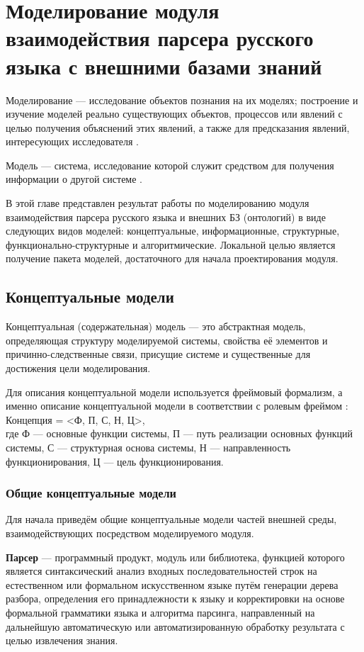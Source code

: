 \indent \section{Моделирование модуля взаимодействия парсера русского языка с внешними базами знаний}

Моделирование --- исследование объектов познания на их моделях; построение и изучение моделей реально существующих объектов, процессов или явлений с целью получения объяснений этих явлений, а также для предсказания явлений, интересующих исследователя \cite{wiki_modelling}.

Модель --- система, исследование которой служит средством для получения информации о другой системе \cite{uemov}.

В этой главе представлен результат работы по моделированию модуля взаимодействия парсера русского языка и внешних БЗ (онтологий) в виде следующих видов моделей: концептуальные, информационные, структурные, функционально-структурные и алгоритмические. Локальной целью является получение пакета моделей, достаточного для начала проектирования модуля.

\subsection{Концептуальные модели}

Концептуальная (содержательная) модель --- это абстрактная модель, определяющая структуру моделируемой системы, свойства её элементов и причинно-следственные связи, присущие системе и существенные для достижения цели моделирования.

Для описания концептуальной модели используется фреймовый формализм, а именно описание концептуальной модели в соответствии с ролевым фреймом \cite{gold}: Концепция = <Ф, П, С, Н, Ц>,\\ где Ф --- основные функции системы, П --- путь реализации основных функций системы, С --- структурная основа системы, Н --- направленность функционирования, Ц --- цель функционирования.

\subsubsection{Общие концептуальные модели}

Для начала приведём общие концептуальные модели частей внешней среды, взаимодействующих посредством моделируемого модуля.

\textbf{Парсер} --- программный продукт, модуль или библиотека, функцией которого является синтаксический анализ входных последовательностей строк на естественном или формальном искусственном языке путём генерации дерева разбора, определения его принадлежности к языку и корректировки на основе формальной грамматики языка и алгоритма парсинга, направленный на дальнейшую автоматическую или автоматизированную обработку результата с целью извлечения знания.

